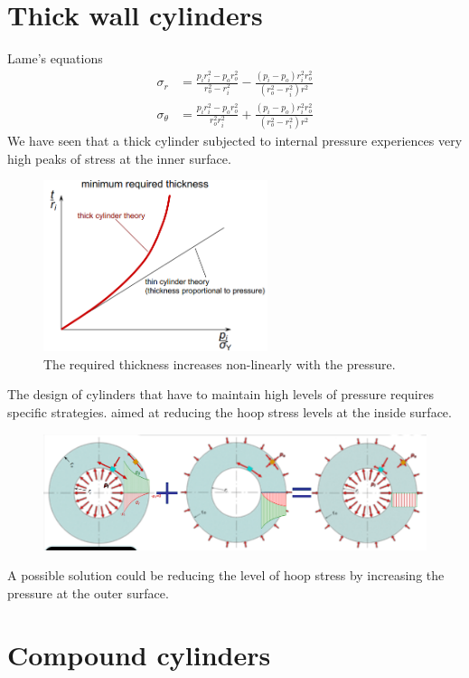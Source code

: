 \documentclass[class=report, crop=false, 12pt,a4paper]{standalone}
\begin{document}
\section{Thick wall cylinders}
Lame's equations
\begin{align}
    \sigma_r &= \frac{p_i r_i^2 - p_or_o^2}{r_o^2 - r_i^2} - \frac{\left(p_i-p_o\right)r_i^2 r_o^2}{\left(r_o^2 - r_i^2\right)r^2}\\
    \sigma_{\theta} &= \frac{p_i r_i^2 - p_o r_o^2}{r_o^2 r_i^2} + \frac{\left(p_i-p_o\right)r_i^2 r_o^2}{\left(r_o^2 - r_i^2\right)r^2}
\end{align}
We have seen that a thick cylinder subjected to internal pressure experiences very high peaks of stress at the inner surface. 
\begin{figure}[H]
    \centering
    \includegraphics[height = 5cm]{../img/diagram118.png}
    \caption{The required thickness increases non-linearly with the pressure.}
\end{figure}
The design of cylinders that have to maintain high levels of pressure requires specific strategies. aimed at reducing the hoop stress levels at the inside surface.
\begin{figure}[H]
    \centering
    \includegraphics[width = \textwidth]{../img/diagram119.png}
    \caption{}
\end{figure}
A possible solution could be reducing the level of hoop stress by increasing the pressure at the outer surface.
\section{Compound cylinders}
\end{document}
